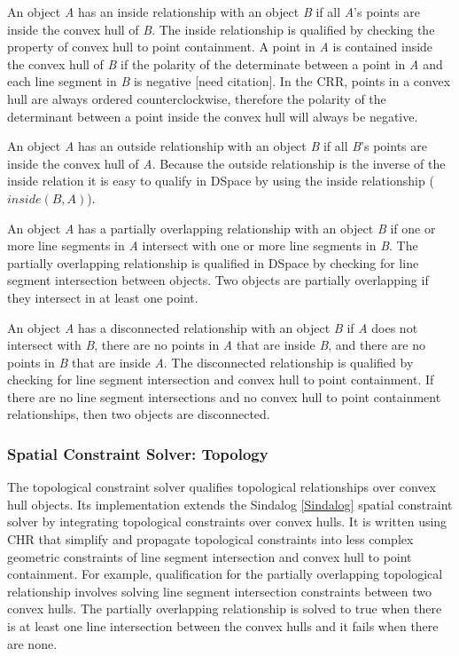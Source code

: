 \documentclass[12pt]{ucthesis}
\begin{document}
An object \emph{A} has an inside relationship with an object \emph{B} if all \emph{A}'s points are inside the convex hull of \emph{B}. The inside relationship is qualified by checking the property of convex hull to point containment. A point in \emph{A} is contained inside the convex hull of \emph{B} if the polarity of the determinate between a point in \emph{A} and each line segment in \emph{B} is negative [need citation]. In the CRR, points in a convex hull are always ordered counterclockwise, therefore the polarity of the determinant between a point inside the convex hull will always be negative. 

An object \emph{A} has an outside relationship with an object \emph{B} if all \emph{B}'s points are inside the convex hull of \emph{A}. Because the outside relationship is the inverse of the inside relation it is easy to qualify in DSpace by using the inside relationship ($inside(B,A)$). 

An object \emph{A} has a partially overlapping relationship with an object \emph{B} if one or more line segments in \emph{A} intersect with one or more line segments in \emph{B}. The partially overlapping relationship is qualified in DSpace by checking for line segment intersection between objects. Two objects are partially overlapping if they intersect in at least one point.  

An object \emph{A} has a disconnected relationship with an object \emph{B} if \emph{A} does not intersect with \emph{B}, there are no points in \emph{A} that are inside \emph{B}, and there are no points in \emph{B} that are inside \emph{A}. The disconnected relationship is qualified by checking for line segment intersection and convex hull to point containment. If there are no line segment intersections and no convex hull to point containment relationships, then two objects are disconnected.  

\subsubsection{Spatial Constraint Solver: Topology}
The topological constraint solver qualifies topological relationships over convex hull objects. Its implementation extends the Sindalog \ref{Sindalog} spatial constraint solver by integrating topological constraints over convex hulls. It is written using CHR that simplify and propagate topological constraints into less complex geometric constraints of line segment intersection and convex hull to point containment. For example, qualification for the partially overlapping topological relationship involves solving line segment intersection constraints between two convex hulls. The partially overlapping relationship is solved to true when there is at least one line intersection between the convex hulls and it fails when there are none. 
\end{document}
